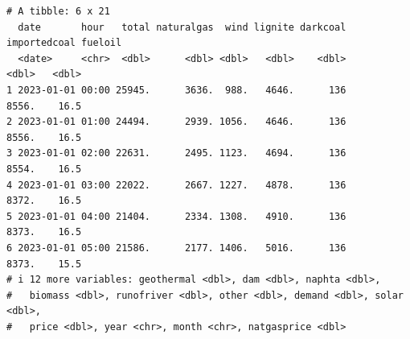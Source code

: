 \documentclass[
]{article}
\newenvironment{Shaded}{\begin{snugshade}}{\end{snugshade}}
\newcommand{\AttributeTok}[1]{\textcolor[rgb]{0.40,0.45,0.13}{#1}}
\newcommand{\FunctionTok}[1]{\textcolor[rgb]{0.28,0.35,0.67}{#1}}
\newcommand{\NormalTok}[1]{\textcolor[rgb]{0.00,0.23,0.31}{#1}}
\newcommand{\OtherTok}[1]{\textcolor[rgb]{0.00,0.23,0.31}{#1}}
\newcommand{\SpecialCharTok}[1]{\textcolor[rgb]{0.37,0.37,0.37}{#1}}
\newcommand{\StringTok}[1]{\textcolor[rgb]{0.13,0.47,0.30}{#1}}
\begin{document}
\begin{Shaded}
\end{Shaded}

\begin{verbatim}
# A tibble: 6 x 21
  date       hour   total naturalgas  wind lignite darkcoal importedcoal fueloil
  <date>     <chr>  <dbl>      <dbl> <dbl>   <dbl>    <dbl>        <dbl>   <dbl>
1 2023-01-01 00:00 25945.      3636.  988.   4646.      136        8556.    16.5
2 2023-01-01 01:00 24494.      2939. 1056.   4646.      136        8556.    16.5
3 2023-01-01 02:00 22631.      2495. 1123.   4694.      136        8554.    16.5
4 2023-01-01 03:00 22022.      2667. 1227.   4878.      136        8372.    16.5
5 2023-01-01 04:00 21404.      2334. 1308.   4910.      136        8373.    16.5
6 2023-01-01 05:00 21586.      2177. 1406.   5016.      136        8373.    15.5
# i 12 more variables: geothermal <dbl>, dam <dbl>, naphta <dbl>,
#   biomass <dbl>, runofriver <dbl>, other <dbl>, demand <dbl>, solar <dbl>,
#   price <dbl>, year <chr>, month <chr>, natgasprice <dbl>
\end{verbatim}
\end{document}

